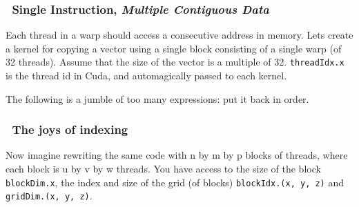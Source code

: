 \subsubsection{~Single Instruction, \emph{Multiple Contiguous
Data}}\label{single-instruction-multiple-contiguous-data}

Each thread in a warp should access a consecutive address in memory.
Lets create a kernel for copying a vector using a single block
consisting of a single warp (of 32 threads). Assume that the size of the
vector is a multiple of 32. \texttt{threadIdx.x} is the thread id in
Cuda, and automagically passed to each kernel.

The following is a jumble of too many expressions: put it back in order.

\begin{Shaded}
\begin{Highlighting}[]
     
\NormalTok{\{}
  \NormalTok{<!-- } \NormalTok{(} \NormalTok{; } 
  \NormalTok{<!-- } \NormalTok{(} \NormalTok{; } \NormalTok{) -->}
  \NormalTok{<!-- } \NormalTok{(} 
   \NormalTok{(} \NormalTok{)}

  \NormalTok{<!-- odata[j + threadIdx.x * }\NormalTok{] = idata[j + threadIdx.x]; -->}
  \NormalTok{<!-- odata[j + threadIdx.x] = idata[j + threadIdx.x * }\NormalTok{]; -->}
  \NormalTok{<!-- odata[j + threadIdx.x * }\NormalTok{] = idata[j + threadIdx.x * }\NormalTok{]; -->}
\NormalTok{\}}
\end{Highlighting}
\end{Shaded}

\subsubsection{~The joys of indexing}\label{the-joys-of-indexing}

Now imagine rewriting the same code with n by m by p blocks of threads,
where each block is u by v by w threads. You have access to the size of
the block \texttt{blockDim.x}, the index and size of the grid (of
blocks) \texttt{blockIdx.(x, y, z)} and \texttt{gridDim.(x, y, z)}.

